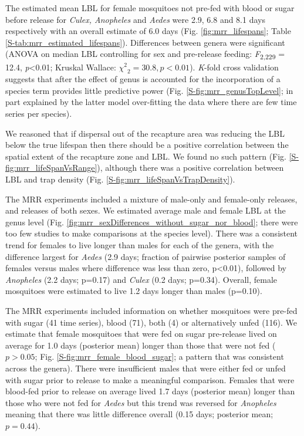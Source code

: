\documentclass[]{article}
\begin{document}
The estimated mean LBL for female mosquitoes not pre-fed with blood or
sugar before release for \emph{Culex, Anopheles} and \emph{Aedes} were
2.9, 6.8 and 8.1 days respectively with an overall estimate of 6.0 days
(Fig. \ref{fig:mrr_lifespans}; Table \ref{S-tab:mrr_estimated_lifespans}). Differences between genera were significant (ANOVA on median
LBL controlling for sex and pre-release feeding:
\emph{F}\textsubscript{2,229} = 12.4, \emph{p}\textless{}0.01; Kruskal
Wallace: \({\chi^{2}}_{2} = 30.8,p < 0.01\)). \emph{K}-fold cross
validation suggests that after the effect of genus is accounted for the
incorporation of a species term provides little predictive power (Fig.
\ref{S-fig:mrr_genusTopLevel}; in part explained by the latter model over-fitting the data where
there are few time series per species).

We reasoned that if dispersal out of the recapture area was reducing the
LBL below the true lifespan then there should be a positive correlation
between the spatial extent of the recapture zone and LBL. We found no
such pattern (Fig. \ref{S-fig:mrr_lifeSpanVsRange}), although there was a positive correlation
between LBL and trap density (Fig. \ref{S-fig:mrr_lifeSpanVsTrapDensity}).

The MRR experiments included a mixture of male-only and female-only
releases, and releases of both sexes. We estimated average male and
female LBL at the genus level (Fig. \ref{fig:mrr_sexDifferences_without_sugar_nor_blood}; there were too few studies to
make comparisons at the species level). There was a consistent trend for
females to live longer than males for each of the genera, with the
difference largest for \emph{Aedes} (2.9 days; fraction of pairwise
posterior samples of females versus males where difference was less than
zero, p\textless{}0.01), followed by \emph{Anopheles} (2.2 days; p=0.17)
and \emph{Culex} (0.2 days; p=0.34). Overall, female mosquitoes were
estimated to live 1.2 days longer than males (p=0.10).

The MRR experiments included information on whether mosquitoes were
pre-fed with sugar (41 time series), blood (71), both (4) or
alternatively unfed (116). We estimate that female mosquitoes that were
fed on sugar pre-release lived on average for 1.0 days (posterior mean) longer than those
that were not fed ($p>0.05$; Fig. \ref{S-fig:mrr_female_blood_sugar}; a pattern that was consistent across the
genera). There were insufficient males that were either fed or unfed
with sugar prior to release to make a meaningful comparison. Females
that were blood-fed prior to release on average lived 1.7 days (posterior mean) longer
than those who were not fed for \emph{Aedes} but this trend was reversed
for \emph{Anopheles} meaning that there was little difference overall (0.15 days; posterior mean; $p=0.44$).
\end{document}
